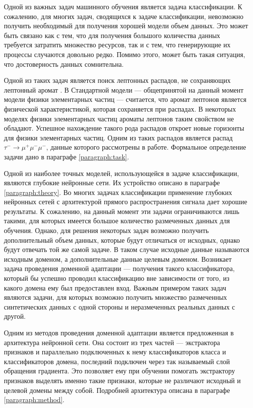 \documentclass[14pt, a4paper]{extarticle}
\begin{document}
Одной из важных задач машинного обучения является задача классификации. К сожалению, для многих задач, сводящихся к задаче классификации, невозможно получить необходимый для получения хорошей модели объем данных. Это может быть связано как с тем, что для получения большого количества данных требуется затратить множество ресурсов, так и с тем, что генерирующие их процессы случаются довольно редко. Помимо этого, может быть такая ситуация, что достоверность данных сомнительна.

Одной из таких задач является поиск лептонных распадов, не сохраняющих лептонный аромат \cite{kaggle}. В Стандартной модели — общепринятой на данный момент модели физики элементарных частиц — считается, что аромат лептонов является физической характеристикой, которая сохраняется при распадах. В некоторых моделях физики элементарных частиц ароматы лептонов таким свойством не обладают. Успешное нахождение такого рода распадов откроет новые горизонты для физики элементарных частиц. Одним из таких распадов является распад $\tau^-\rightarrow\mu^+ \mu^- \mu^-$, данные которого рассмотрены в работе. Формальное определение задачи дано в параграфе \ref{paragraph:task}.

Одной из наиболее точных моделей, использующейся в задаче классификации, являются глубокие нейронные сети. Их устройство описано в параграфе \ref{paragraph:theory}. Во многих задачах классификации применение глубоких нейронных сетей с архитектурой прямого распространения сигнала дает хорошие результаты. К сожалению, на данный момент эти задачи ограничиваются лишь такими, для которых имеется большое количество размеченных данных для обучения.
Однако, для решения некоторых задач возможно получить дополнительный объем данных, которые будут отличаться от исходных, однако будут отвечать той же самой задаче. В таком случае исходные данные называются исходным доменом, а дополнительные данные целевым доменом. Возникает задача проведения доменной адаптации — получения такого классификатора, который бы успешно проводил классификацию вне зависимости от того, из какого домена ему был предоставлен вход. Важным примером таких задач являются задачи, для которых возможно получить множество размеченных синтетических данных с одной стороны и неразмеченных реальных данных с другой.

Одним из методов проведения доменной адаптации является предложенная в \cite{ganin} архитектура нейронной сети. Она состоит из трех частей — экстрактора признаков и параллельно подключенных к нему классификаторов класса и классификаторов домена, последний подключен через так называемый слой обращения градиента. Это позволяет ему при обучении помогать экстрактору признаков выделять именно такие признаки, которые не различают исходный и целевой домены между собой. Подробней архитектура описана в параграфе \ref{paragraph:method}.
\end{document}
